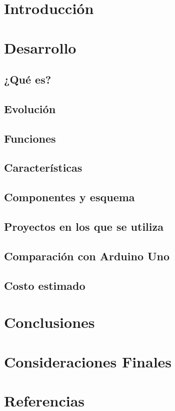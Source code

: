 \documentclass{extbook}
\begin{document}

\tableofcontents
\listoffigures
\listoftables %
\chapter{Introducción}

\chapter{Desarrollo}
\section{¿Qué es?}

\section{Evolución}

\section{Funciones}

\section{Características}

\section{Componentes y esquema}

\section{Proyectos en los que se utiliza}

\section{Comparación con Arduino Uno}

\section{Costo estimado}

\chapter{Conclusiones}

\chapter{Consideraciones Finales}

\chapter{Referencias}

\end{document}

